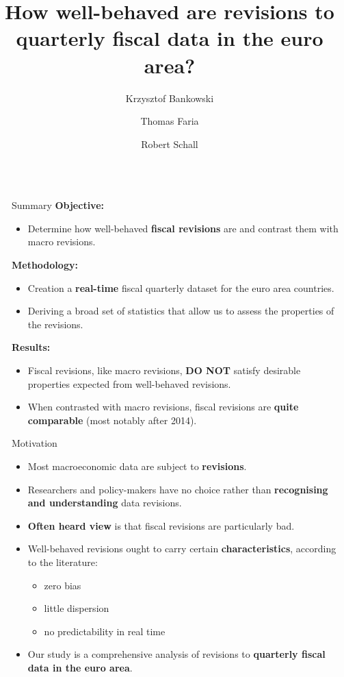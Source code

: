 \documentclass[final]{beamer}
\title{How well-behaved are revisions to quarterly fiscal data in the euro area?}
\author{Krzysztof Bankowski \inst{1} \and Thomas Faria \inst{2} \and Robert Schall \inst{3}}
\institute[shortinst]{\inst{1} European Central Bank \samelineand \inst{2} Insee \samelineand \inst{3} European University Institute}
\newlength{\sepwidth}
\newlength{\colwidth}
\newcommand{\separatorcolumn}{\begin{column}{\sepwidth}\end{column}}
\begin{document}
\begin{frame}[t]
\begin{columns}[t]
\separatorcolumn

\begin{column}{\colwidth}
 
  \begin{alertblock}{Summary}
    \textbf{Objective:}
    \begin{itemize}
      \item Determine how well-behaved \textbf{fiscal revisions} are and contrast them with macro revisions.
    \end{itemize}

    \textbf{Methodology:}
    \begin{itemize}
        \item Creation a \textbf{real-time} fiscal quarterly dataset for the euro area countries.
        \item Deriving a broad set of statistics that allow us to assess the properties of the revisions.
      \end{itemize}

    \textbf{Results:}
    \begin{itemize}
      \item Fiscal revisions, like macro revisions, \textbf{DO NOT} satisfy desirable properties expected from well-behaved revisions.
      \item When contrasted with macro revisions, fiscal revisions are \textbf{quite comparable} (most notably after 2014).
    \end{itemize}

  \end{alertblock}

  \begin{block}{Motivation}

    \begin{itemize}
      \item Most macroeconomic data are subject to \textbf{revisions}.
      \item Researchers and policy-makers have no choice rather than \textbf{recognising and understanding} data revisions.
      \item \textbf{Often heard view} is that fiscal revisions are particularly bad.
      \item Well-behaved revisions ought to carry certain \textbf{characteristics}, according to the literature:
      \begin{itemize}
        \item zero bias
        \item little dispersion 
        \item no predictability in real time
      \end{itemize}
      \item Our study is a comprehensive analysis of revisions to \textbf{quarterly fiscal data in the euro area}.
    \end{itemize}
  \end{block}


\end{column}
\end{columns}
\end{frame}
\end{document}
